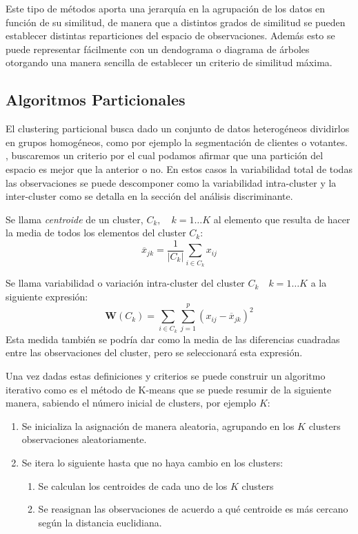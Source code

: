 \noindent Este tipo de métodos aporta una jerarquía en la agrupación de los datos en función de su similitud, de manera que a distintos grados de similitud se pueden establecer distintas reparticiones del espacio de observaciones. Además esto se puede representar fácilmente con un dendograma o diagrama de árboles otorgando una manera sencilla de establecer un criterio de similitud máxima. 

\subsection{Algoritmos Particionales}

\noindent El clustering particional busca dado un conjunto de datos heterogéneos dividirlos en grupos homogéneos, como por ejemplo la segmentación de clientes o votantes.
, buscaremos un criterio por el cual podamos afirmar que una partición del espacio es mejor que la anterior o no. En estos casos la variabilidad total de todas las observaciones se puede descomponer como la variabilidad intra-cluster y la inter-cluster como se detalla en la sección del análisis discriminante.

\begin{defi}
Se llama \emph{centroide} de un cluster, $C_k,\quad k=1\ldots K$ al elemento que resulta de hacer la media de todos los elementos del cluster $C_k$:
\begin{equation}
\overline{x}_{jk}=\dfrac{1}{|C_k|}\sum_{i\in C_k} x_{ij}
\end{equation}
\end{defi}

\begin{defi}
Se llama variabilidad o variación intra-cluster del cluster $C_k\quad k=1\ldots K$ a la siguiente expresión:
\begin{equation}
\mathbf{W}(C_k)=\sum_{i\in C_k}\sum_{j=1}^{p} (x_{ij}-\overline{x}_{jk})^2
\end{equation}
\noindent Esta medida también se podría dar como la media de las diferencias cuadradas entre las observaciones del cluster, pero se seleccionará esta expresión. 
\end{defi}

\noindent Una vez dadas estas definiciones y criterios se puede construir un algoritmo iterativo como es el método de K-means que se puede resumir de la siguiente manera, sabiendo el número inicial de clusters, por ejemplo $K$:
\begin{enumerate}
\item Se inicializa la asignación de manera aleatoria, agrupando en los $K$ clusters observaciones aleatoriamente. 
\item Se itera lo siguiente hasta que no haya cambio en los clusters:
\begin{enumerate}
\item Se calculan los centroides de cada uno de los $K$ clusters
\item Se reasignan las observaciones de acuerdo a qué centroide es más cercano según la distancia euclidiana. 
\end{enumerate}
\end{enumerate}

